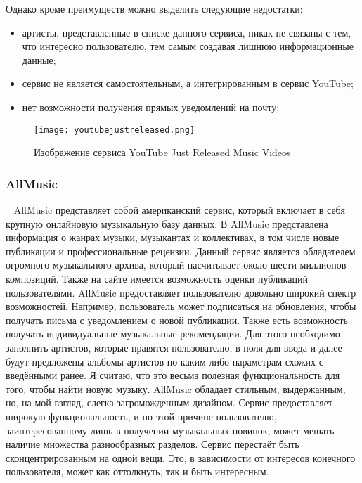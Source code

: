 Однако кроме преимуществ можно выделить следующие недостатки:

\begin{itemize}
  \item артисты, представленные в списке данного сервиса, никак не связаны с тем, что интересно пользователю, тем самым создавая лишнюю информационные данные;
  \item сервис не является самостоятельным, а интегрированным в сервис YouTube;
  \item нет возможности получения прямых уведомлений на почту;
\end{itemize}

\begin{figure}[ht]
\centering
  \texttt{[image: youtubejustreleased.png]}
  \caption{ Изображение сервиса YouTube Just Released Music Videos }
  \label{fig:domain:youtube_just_released_music_videos:picture}
\end{figure}

\subsubsection{AllMusic}
\label{sub:domain:analogues_review:allmusic}
~\newline
\indent AllMusic представляет собой американский сервис, который включает в себя крупную онлайновую музыкальную базу данных. В AllMusic представлена информация о жанрах музыки, музыкантах и коллективах, в том числе новые публикации и профессиональные рецензии. Данный сервис является обладателем огромного музыкального архива, который насчитывает около шести миллионов композиций. Также на сайте имеется возможность оценки публикаций пользователями.
AllMusic предоставляет пользователю довольно широкий спектр возможностей. Например, пользователь может подписаться на обновления, чтобы получать письма с уведомлением о новой публикации. Также есть возможность получать индивидуальные музыкальные рекомендации. Для этого необходимо заполнить артистов, которые нравятся пользователю, в поля для ввода и далее будут предложены альбомы артистов по каким-либо параметрам схожих с введёнными ранее. Я считаю, что это весьма полезная функциональность для того, чтобы найти новую музыку.
AllMusic обладает стильным, выдержанным, но, на мой взгляд, слегка загроможденным дизайном. Сервис предоставляет широкую функциональность, и по этой причине пользователю, заинтересованному лишь в получении музыкальных новинок, может мешать наличие множества разнообразных разделов. Сервис перестаёт быть сконцентрированным на одной вещи. Это, в зависимости от интересов конечного пользователя, может как оттолкнуть, так и быть интересным.

